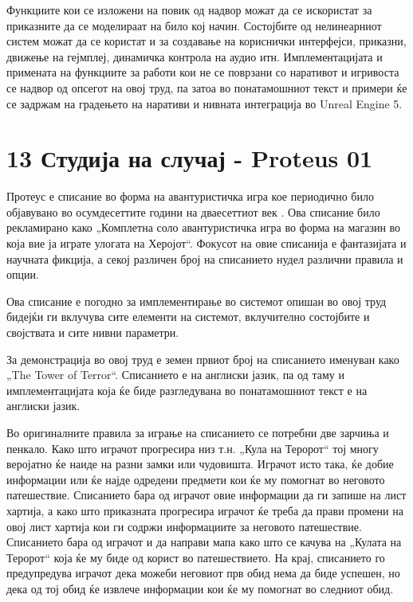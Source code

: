 Функциите кои се изложени на повик од надвор можат да се искористат за приказните да се моделираат на било кој начин. Состојбите од нелинеарниот систем можат да се користат и за создавање на кориснички интерфејси, приказни, движење на гејмплеј, динамичка контрола на аудио итн. Имплементацијата и примената на функциите за работи кои не се поврзани со наративот и игривоста се надвор од опсегот на овој труд, па затоа во понатамошниот текст и примери ќе се задржам на градењето на наративи и нивната интеграција во Unreal Engine 5.

\section{13 Студија на случај - Proteus 01}

Протеус е списание во форма на авантуристичка игра кое периодично било објавувано во осумдесеттите години на дваесеттиот век \cite{ref19}. Ова списание било рекламирано како „Комплетна соло авантуристичка игра во форма на магазин во која вие ја играте улогата на Херојот“. Фокусот на овие списанија е фантазијата и научната фикција, а секој различен број на списанието нудел различни правила и опции.

Ова списание е погодно за имплементирање во системот опишан во овој труд бидејќи ги вклучува сите елементи на системот, вклучително состојбите и својствата и сите нивни параметри.


За демонстрација во овој труд е земен првиот број на списанието именуван како „The Tower of Terror“. Списанието е на англиски јазик, па од таму и имплементацијата која ќе биде разгледувана во понатамошниот текст е на англиски јазик.

Во оригиналните правила за играње на списанието се потребни две зарчиња и пенкало. Како што играчот прогресира низ т.н. „Кула на Теророт“ тој многу веројатно ќе наиде на разни замки или чудовишта. Играчот исто така, ќе добие информации или ќе најде одредени предмети кои ќе му помогнат во неговото патешествие. Списанието бара од играчот овие информации да ги запише на лист хартија, а како што приказната прогресира играчот ќе треба да прави промени на овој лист хартија кои ги содржи информациите за неговото патешествие. Списанието бара од играчот и да направи мапа како што се качува на „Кулата на Теророт“ која ќе му биде од корист во патешествието. На крај, списанието го предупредува играчот дека можеби неговиот прв обид нема да биде успешен, но дека од тој обид ќе извлече информации кои ќе му помогнат во следниот обид.

